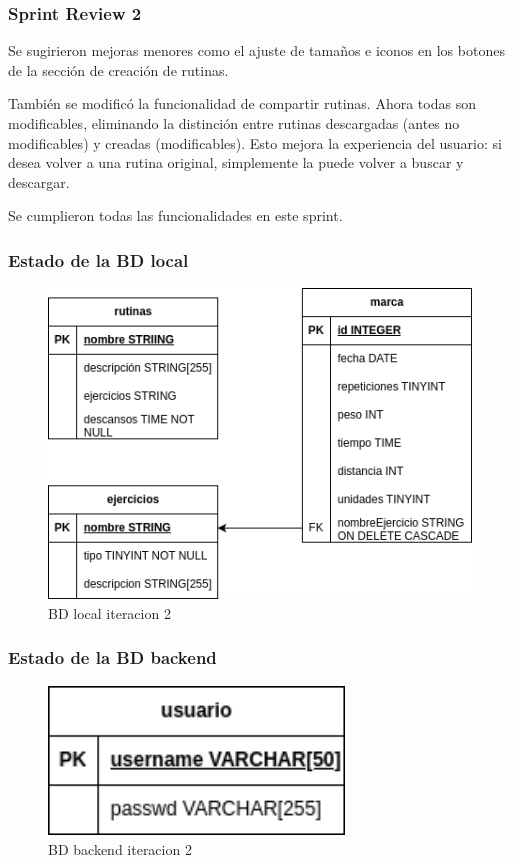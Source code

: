 \subsubsection{Sprint Review 2}
Se sugirieron mejoras menores como el ajuste de tama\~nos e iconos en los botones de la secci\'on de creaci\'on de rutinas.

Tambi\'en se modific\'o la funcionalidad de compartir rutinas. Ahora todas son modificables, eliminando la distinci\'on entre rutinas descargadas (antes no modificables) y creadas (modificables). Esto mejora la experiencia del usuario: si desea volver a una rutina original, simplemente la puede volver a buscar y descargar.

Se cumplieron todas las funcionalidades en este sprint.

\subsubsection{Estado de la BD local}

\begin{figure}[H]
   \centering
    \includegraphics[width=\textwidth]{fotos/BDL iteracion 2.png}
    \caption{BD local iteracion 2}
    \label{fig:BD local iteracion 2}
\end{figure}

\subsubsection{Estado de la BD backend}

\begin{figure}[H]
   \centering
    \includegraphics[width=0.7\textwidth]{fotos/BD be iteracion 2.png}
    \caption{BD backend iteracion 2}
    \label{fig:BD backend iteracion 2}
\end{figure}

